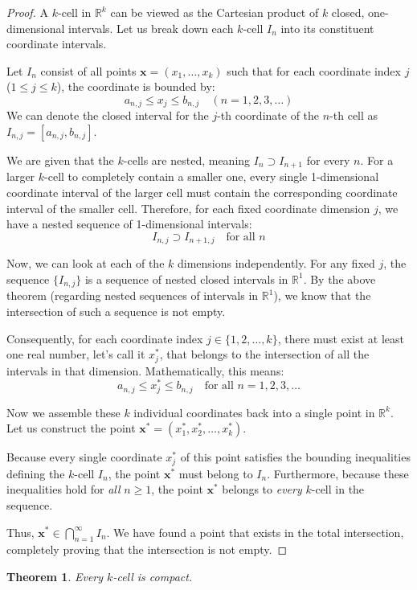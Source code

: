\documentclass{article}
\theoremstyle{mythm}
\newtheorem{theorem}{Theorem}[section]
\begin{document}
\begin{proof}
A $k$-cell in $\mathbb{R}^k$ can be viewed as the Cartesian product of $k$ closed, one-dimensional intervals. Let us break down each $k$-cell $I_n$ into its constituent coordinate intervals. 

Let $I_n$ consist of all points $\mathbf{x} = (x_1, \dots, x_k)$ such that for each coordinate index $j$ ($1 \le j \le k$), the coordinate is bounded by:
\[ a_{n,j} \le x_j \le b_{n,j} \quad (n = 1, 2, 3, \dots) \]
We can denote the closed interval for the $j$-th coordinate of the $n$-th cell as $I_{n,j} = [a_{n,j}, b_{n,j}]$.

We are given that the $k$-cells are nested, meaning $I_n \supset I_{n+1}$ for every $n$. For a larger $k$-cell to completely contain a smaller one, every single 1-dimensional coordinate interval of the larger cell must contain the corresponding coordinate interval of the smaller cell. Therefore, for each fixed coordinate dimension $j$, we have a nested sequence of 1-dimensional intervals:
\[ I_{n,j} \supset I_{n+1,j} \quad \text{for all } n \]

Now, we can look at each of the $k$ dimensions independently. For any fixed $j$, the sequence $\{I_{n,j}\}$ is a sequence of nested closed intervals in $\mathbb{R}^1$. By the above theorem (regarding nested sequences of intervals in $\mathbb{R}^1$), we know that the intersection of such a sequence is not empty.

Consequently, for each coordinate index $j \in \{1, 2, \dots, k\}$, there must exist at least one real number, let's call it $x_j^*$, that belongs to the intersection of all the intervals in that dimension. Mathematically, this means:
\[ a_{n,j} \le x_j^* \le b_{n,j} \quad \text{for all } n = 1, 2, 3, \dots \]

Now we assemble these $k$ individual coordinates back into a single point in $\mathbb{R}^k$. Let us construct the point $\mathbf{x}^* = (x_1^*, x_2^*, \dots, x_k^*)$. 

Because every single coordinate $x_j^*$ of this point satisfies the bounding inequalities defining the $k$-cell $I_n$, the point $\mathbf{x}^*$ must belong to $I_n$. Furthermore, because these inequalities hold for \textit{all} $n \ge 1$, the point $\mathbf{x}^*$ belongs to \textit{every} $k$-cell in the sequence. 

Thus, $\mathbf{x}^* \in \bigcap_{n=1}^\infty I_n$. We have found a point that exists in the total intersection, completely proving that the intersection is not empty.
\end{proof}
\begin{theorem}
Every $k$-cell is compact.
\end{theorem}
\end{document}
